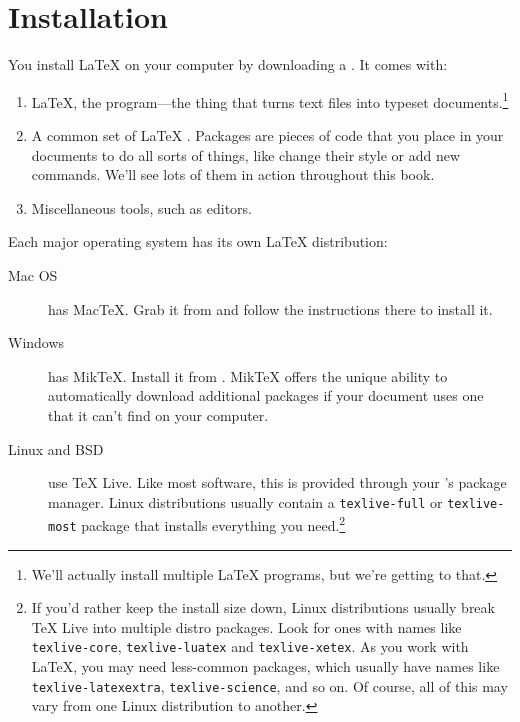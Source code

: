 \chapter{Installation}
\label{installation}

You install \LaTeX{} on your computer by downloading a .
It comes with:
\begin{enumerate}
\item \LaTeX, the program---the thing that turns text files into typeset
    documents.\footnote{We'll actually install multiple \LaTeX{} programs,
    but we're getting to that.}
\item A common set of \LaTeX{} .
    Packages are pieces of code that you place in your documents to
    do all sorts of things, like change their style or add new commands.
    We'll see lots of them in action throughout this book.
\item Miscellaneous tools, such as editors.
\end{enumerate}
Each major operating system has its own \LaTeX{} distribution:
\begin{description}
\item[Mac OS] has Mac\TeX. Grab it from 
    and follow the instructions there to install it.

\item[Windows] has Mik\TeX.
    Install it from .
    Mik\TeX{} offers the unique ability to automatically download
    additional packages if your document uses one that it can't find
    on your computer.

\item[Linux and BSD] use \TeX{} Live.
    Like most software, this is provided through your
    's package manager.
    Linux distributions usually contain a \texttt{texlive-\allowbreak full}
    or \texttt{texlive-\allowbreak most} package that installs everything
    you need.\punckern\footnote{%
    If you'd rather keep the install size down,
    Linux distributions usually break \TeX{} Live into multiple distro packages.
    Look for ones with names like
    \texttt{texlive-\allowbreak core}, \texttt{texlive-\allowbreak luatex}
    and \texttt{texlive-\allowbreak xetex}.
    As you work with \LaTeX, you may need less-common packages,
    which usually have names like \texttt{texlive-\allowbreak latexextra},
    \texttt{texlive-\allowbreak science}, and so on.
    Of course, all of this may vary from one Linux distribution to another.}
\end{description}

